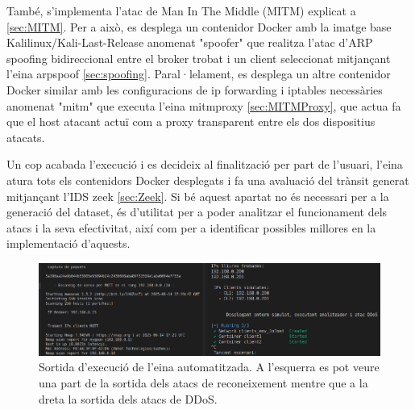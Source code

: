 També, s'implementa l'atac de Man In The Middle (MITM) explicat a \ref{sec:MITM}. Per a això, es desplega un contenidor Docker amb la imatge base Kalilinux/Kali-Last-Release anomenat "spoofer" que realitza l'atac d'ARP spoofing bidireccional entre el broker trobat i un client seleccionat mitjançant l'eina arpspoof \ref{sec:spoofing}. Paral·lelament, es desplega un altre contenidor Docker similar amb les configuracions de ip forwarding i iptables necessàries anomenat "mitm" que executa l'eina mitmproxy \ref{sec:MITMProxy}, que actua fa que el host atacant actuï com a proxy transparent entre els dos dispositius atacats.

Un cop acabada l'execució i es decideix al finalització per part de l'usuari, l'eina atura tots els contenidors Docker desplegats i fa una avaluació del trànsit generat mitjançant l'IDS zeek \ref{sec:Zeek}. Si bé aquest apartat no és necessari per a la generació del dataset, és d'utilitat per a poder analitzar el funcionament dels atacs i la seva efectivitat, així com per a identificar possibles millores en la implementació d'aquests.

  \begin{figure}[H]
    \centering
    \includegraphics[width=1\textwidth]{img/tool.png}
    \caption{Sortida d'execució de l'eina automatitzada. A l'esquerra es pot veure una part de la sortida dels atacs de reconeixement mentre que a la dreta la sortida dels atacs de DDoS.}
    \label{fig:tool}
  \end{figure}


\